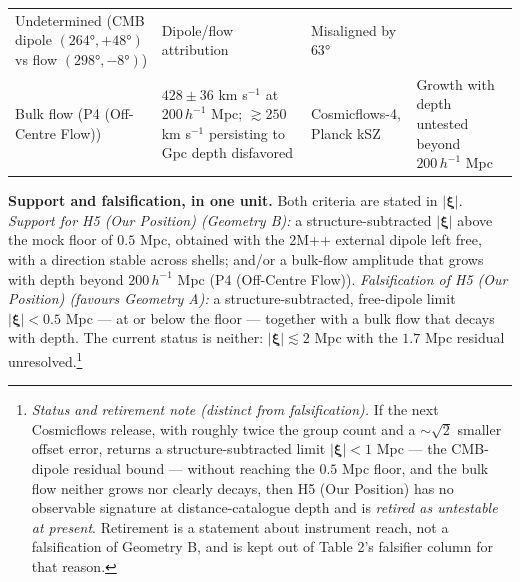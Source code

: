\documentclass[
]{article}
\begin{document}
\begin{longtable}[]{@{}llll@{}}
\begin{minipage}[t]{0.22\columnwidth}
Undetermined (CMB dipole \((264°,+48°)\) vs flow \((298°,-8°)\))\strut
\end{minipage} & \begin{minipage}[t]{0.22\columnwidth}\raggedright
Dipole/flow attribution\strut
\end{minipage} & \begin{minipage}[t]{0.22\columnwidth}\raggedright
Misaligned by \(63°\)\strut
\end{minipage}\tabularnewline
\begin{minipage}[t]{0.22\columnwidth}\raggedright
Bulk flow (P4 (Off-Centre Flow))\strut
\end{minipage} & \begin{minipage}[t]{0.22\columnwidth}\raggedright
\(428 \pm 36\) km s\(^{-1}\) at \(200\,h^{-1}\) Mpc; \(\gtrsim 250\) km
s\(^{-1}\) persisting to Gpc depth disfavored\strut
\end{minipage} & \begin{minipage}[t]{0.22\columnwidth}\raggedright
Cosmicflows-4, Planck kSZ\strut
\end{minipage} & \begin{minipage}[t]{0.22\columnwidth}\raggedright
Growth with depth untested beyond \(200\,h^{-1}\) Mpc\strut
\end{minipage}\tabularnewline
\bottomrule
\end{longtable}

\textbf{Support and falsification, in one unit.} Both criteria are
stated in \(|\boldsymbol{\xi}|\). \emph{Support for H5 (Our Position)
(Geometry B):} a structure-subtracted \(|\boldsymbol{\xi}|\) above the
mock floor of \(0.5\) Mpc, obtained with the 2M++ external dipole left
free, with a direction stable across shells; and/or a bulk-flow
amplitude that grows with depth beyond \(200\,h^{-1}\) Mpc (P4
(Off-Centre Flow)). \emph{Falsification of H5 (Our Position) (favours
Geometry A):} a structure-subtracted, free-dipole limit
\(|\boldsymbol{\xi}| < 0.5\) Mpc --- at or below the floor --- together
with a bulk flow that decays with depth. The current status is neither:
\(|\boldsymbol{\xi}| \lesssim 2\) Mpc with the \(1.7\) Mpc residual
unresolved.\footnote{\emph{Status and retirement note (distinct from
  falsification).} If the next Cosmicflows release, with roughly twice
  the group count and a \(\sim\!\sqrt{2}\) smaller offset error, returns
  a structure-subtracted limit \(|\boldsymbol{\xi}| < 1\) Mpc --- the
  CMB-dipole residual bound --- without reaching the \(0.5\) Mpc floor,
  and the bulk flow neither grows nor clearly decays, then H5 (Our
  Position) has no observable signature at distance-catalogue depth and
  is \emph{retired as untestable at present}. Retirement is a statement
  about instrument reach, not a falsification of Geometry B, and is kept
  out of Table 2's falsifier column for that reason.}
\end{document}
